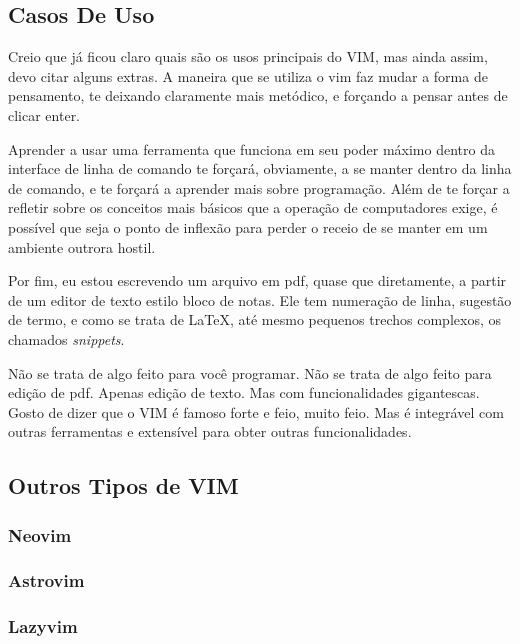 \documentclass[a4paper, 12pt]{article}
\begin{document}
\subsection{Casos De Uso}
Creio que já ficou claro quais são os usos principais do VIM, mas ainda assim, devo citar alguns extras.
A maneira que se utiliza o vim faz mudar a forma de pensamento, te deixando claramente mais metódico, e forçando a pensar antes de clicar enter.

Aprender a usar uma ferramenta que funciona em seu poder máximo dentro da interface de linha de comando te forçará, obviamente, a se manter dentro da linha de comando, e te forçará a aprender mais sobre programação.
Além de te forçar a refletir sobre os conceitos mais básicos que a operação de computadores exige, é possível que seja o ponto de inflexão para perder o receio de se manter em um ambiente outrora hostil.

Por fim, eu estou escrevendo um arquivo em pdf, quase que diretamente, a partir de um editor de texto estilo bloco de notas. 
Ele tem numeração de linha, sugestão de termo, e como se trata de \LaTeX, até mesmo pequenos trechos complexos, os chamados \textit{snippets}.

Não se trata de algo feito para você programar.
Não se trata de algo feito para edição de pdf.
Apenas edição de texto. Mas com funcionalidades gigantescas.
Gosto de dizer que o VIM é famoso forte e feio, muito feio. 
Mas é integrável com outras ferramentas e extensível para obter outras funcionalidades.

\subsection{Outros Tipos de VIM}
\subsubsection{Neovim}
\subsubsection{Astrovim}
\subsubsection{Lazyvim}

\end{document}
